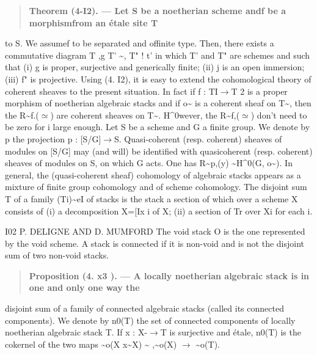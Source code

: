 \documentclass[11pt]{article}
\theoremstyle{plain}
\theoremstyle{definition}
\theoremstyle{remark}
\begin{document}
\begin{quote}\textbf{Theorem (4-I2). --- Let S be a noetherian scheme andf be a morphismfrom an \'etale site T}\end{quote}
to S. We assumef to be separated and offinite type. Then, there exists a commutative diagram T ,g T' \textasciitilde{}, T" ! t' in which T' and T" are schemes and such that (i) g is proper, surjective and generically finite; (ii) j is an open immersion; (iii) f" is projective. Using (4. I2), it is easy to extend the cohomological theory of coherent sheaves to the present situation. In fact if f : TI$\to$T 2 is a proper morphism of noetherian algebraic stacks and if o\textasciitilde{} is a coherent sheaf on T\textasciitilde{}, then the R\textasciitilde{}f.($\simeq$) are coherent sheaves on T\textasciitilde{}. H\textasciicircum{}0wever, the R\textasciitilde{}f,($\simeq$) don't need to be zero for i large enough. Let S be a scheme and G a finite group. We denote by p the projection p : [S/G]$\to$S. Quasi-coherent (resp. coherent) sheaves of modules on [S/G] may (and will) be identified with quasicoherent (resp. coherent) sheaves of modules on S, on which G acts. One has R\textasciitilde{}p,(y) \textasciitilde{}H\textasciicircum{}0(G, o\textasciitilde{}). In general, the (quasi-coherent sheaf) cohomology of algebraic stacks appears as a mixture of finite group cohomology and of scheme cohomology. The disjoint sum T of a family (Ti)\textasciitilde{}eI of stacks is the stack a section of which over a scheme X consists of (i) a decomposition X=[Ix i of X; (ii) a section of Tr over Xi for each i.

I02 P. DELIGNE AND D. MUMFORD The void stack O is the one represented by the void scheme. A stack is connected if it is non-void and is not the disjoint sum of two non-void stacks.

\begin{quote}\textbf{Proposition (4. x3 ). --- A locally noetherian algebraic stack is in one and only one way the}\end{quote}
disjoint sum of a family of connected algebraic stacks (called its connected components). We denote by n0(T) the set of connected components of locally noetherian algebraic stack T. If x : X-$\to$T is surjective and \'etale, n0(T) is the cokernel of the two maps \textasciitilde{}o(X x\textasciitilde{}X) \textasciitilde{} ,\textasciitilde{}o(X) $\to$ \textasciitilde{}o(T).
\end{document}
